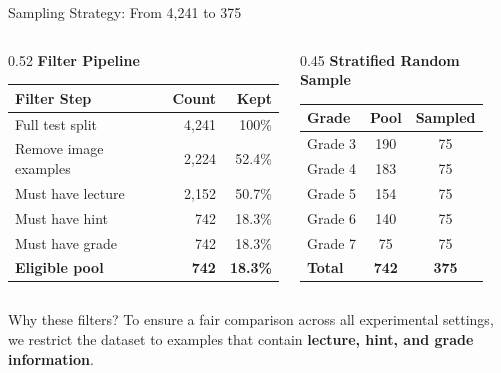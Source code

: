 \documentclass[aspectratio=169]{beamer}
\begin{document}
\begin{frame}{Sampling Strategy: From 4{,}241 to 375}

\begin{columns}[T]
  \begin{column}{0.52\textwidth}
    \textbf{Filter Pipeline}\\[6pt]
    \begin{tabular}{lrr}
      \toprule
      \textbf{Filter Step} & \textbf{Count} & \textbf{Kept}\\
      \midrule
      Full test split       & 4,241 & 100\%\\
      \rowcolor{palepurple}
      Remove image examples & 2,224 & 52.4\%\\
      Must have lecture     & 2,152 & 50.7\%\\
      \rowcolor{palepurple}
      Must have hint        & 742   & 18.3\%\\
      Must have grade       & 742   & 18.3\%\\
      \midrule
      \rowcolor{custompurple!15}
      \textbf{Eligible pool}& \textbf{742} & \textbf{18.3\%}\\
      \bottomrule
    \end{tabular}
    
    
  
  \end{column}
  \begin{column}{0.45\textwidth}
    \textbf{Stratified Random Sample}\\[6pt]
    \begin{tabular}{lcc}
      \toprule
      \textbf{Grade} & \textbf{Pool} & \textbf{Sampled}\\
      \midrule
      Grade 3 & 190 & 75\\
      Grade 4 & 183 & 75\\
      Grade 5 & 154 & 75\\
      Grade 6 & 140 & 75\\
      Grade 7 & 75 & 75\\
      \midrule
      \textbf{Total} & \textbf{742} & \textbf{375}\\
      \bottomrule
    \end{tabular}
    \vspace{0.3cm}
   
  \end{column}
\end{columns}
\begin{block}{Why these filters?}
\small
To ensure a fair comparison across all experimental settings, we restrict the dataset 
to examples that contain \textbf{lecture, hint, and grade information}. 

\end{block}
\end{frame}
\end{document}
